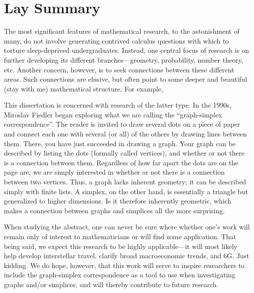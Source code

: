 \chapter*{Lay Summary}

The  most  significant features of mathematical research, to the astonishment of  many, do not involve generating contrived  calculus  questions with which to torture sleep-deprived undergraduates. 
Instead, one central focus of research is  on further developing  its different branches---geometry, probability, number theory, etc.  Another concern, however, is to seek connections between these different areas. Such  connections are elusive, but often point to some deeper and beautiful (stay with me) mathematical structure. For example, 

This dissertation is concerned with research of the latter type. In  the 1990s, Miroslav Fiedler began exploring what we are calling the ``graph-simplex correspondence''. 
The  reader is invited  to draw several dots  on a piece of paper and connect each one with  several (or all) of the others by drawing  lines between them. There, you have  just succeeded in drawing a graph. Your graph can be  described  by listing the dots (formally  called vertices), and whether or not there is a  connection between  them. Regardless of how far  apart the dots  are on the page are, we are  simply interested in whether or not there is a  connection between two vertices. Thus, a graph  lacks inherent  geometry; it  can  be described simply with finite  lists. A simplex, on the other  hand, is essentially a triangle but generalized  to higher dimensions. Is it therefore inherently geometric, which makes a connection between graphs and simplices all the more surprising. 

When studying the abstract, one can never be  sure where whether one's work will remain only of interest to mathematicians or will find some application. That being said, we expect this research to be highly applicable---it will most likely help develop interstellar travel, clarify broad macroeconomic trends, and 6G. Just kidding. We do hope, however, that this work will serve to inspire researchers to include the  graph-simplex correspondence as a tool to use when  investigating graphs and/or simplices, and will thereby contribute to future  research. 
 


